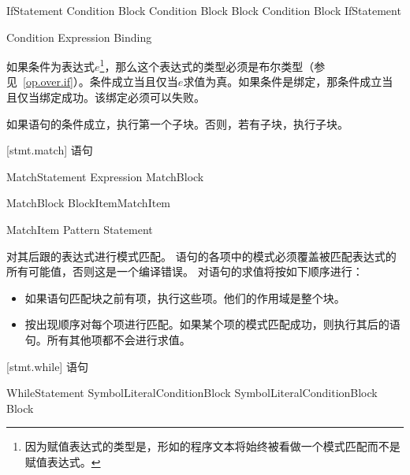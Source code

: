 \begin{bnf}{IfStatement}
     Condition Block \br
     Condition Block  Block \br
     Condition Block  IfStatement
\end{bnf}

\begin{bnf}{Condition}
    Expression \br
    Binding
\end{bnf}

\pnum
如果条件为表达式$e$\footnote{因为赋值表达式的类型是，形如的程序文本将始终被看做一个模式匹配而不是赋值表达式。}，那么这个表达式的类型必须是布尔类型（参见~\ref{op.over.if}）。条件成立当且仅当$e$求值为真。如果条件是绑定，那条件成立当且仅当绑定成功。该绑定必须可以失败。

\pnum
如果语句的条件成立，执行第一个子块。否则，若有子块，执行子块。

[stmt.match]{ 语句}

\begin{bnf}{MatchStatement}
     Expression MatchBlock
\end{bnf}

\begin{bnf}{MatchBlock}
    \terminal{\{} BlockItem\bnfs MatchItem\bnfp \terminal{\}}
\end{bnf}

\begin{bnf}{MatchItem}
    Pattern \terminal{->} Statement
\end{bnf}

\pnum
{}对其后跟的表达式进行模式匹配。
语句的各项中的模式必须覆盖被匹配表达式的所有可能值，否则这是一个编译错误。
对语句的求值将按如下顺序进行：

\begin{itemize}
    \item 如果语句匹配块之前有项，执行这些项。他们的作用域是整个块。
    \item 按出现顺序对每个项进行匹配。如果某个项的模式匹配成功，则执行其后的语句。所有其他项都不会进行求值。
\end{itemize}

[stmt.while]{ 语句}

\begin{bnf}{WhileStatement}
     SymbolLiteral\bnfq Condition\bnfq Block \br
     SymbolLiteral\bnfq Condition\bnfq Block  Block
\end{bnf}

